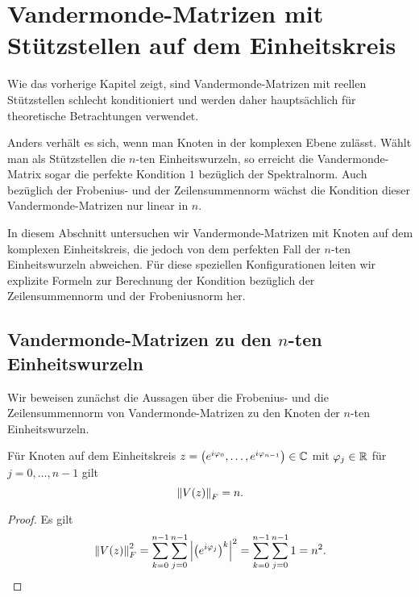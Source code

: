 \chapter{Vandermonde-Matrizen mit Stützstellen auf dem Einheitskreis}

Wie das vorherige Kapitel zeigt, sind Vandermonde-Matrizen mit reellen
Stützstellen schlecht konditioniert und werden daher hauptsächlich für
theoretische Betrachtungen verwendet.

Anders verhält es sich, wenn man Knoten in der komplexen Ebene zulässt.
Wählt man als Stützstellen die $n$-ten Einheitswurzeln, so erreicht die
Vandermonde-Matrix sogar die perfekte Kondition $1$ bezüglich der Spektralnorm.
Auch bezüglich der Frobenius- und der Zeilensummennorm wächst die Kondition
dieser Vandermonde-Matrizen nur linear in $n$.

In diesem Abschnitt untersuchen wir Vandermonde-Matrizen mit Knoten auf dem
komplexen Einheitskreis, die jedoch von dem perfekten Fall der $n$-ten
Einheitswurzeln abweichen.
Für diese speziellen Konfigurationen leiten wir explizite Formeln zur
Berechnung der Kondition bezüglich der Zeilensummennorm und der Frobeniusnorm
her.

\section[Vandermonde-Matrizen zu den $n$-ten Einheitswurzeln]{Vandermonde-Matrizen zu den \boldmath $n$-ten Einheitswurzeln}


Wir beweisen zunächst die Aussagen über die Frobenius- und die Zeilensummennorm
von Vandermonde-Matrizen zu den Knoten der $n$-ten Einheitswurzeln.
\begin{lemma}
    \label{lemma:frobenius_norm_vandermonde_unit_circle}
    Für Knoten auf dem Einheitskreis
    $z = \left(e^{i \varphi_0}, \dots, e^{i \varphi_{n-1}} \right) \in \mathbb{C}$
    mit $\varphi_j \in \mathbb{R}$ für $j = 0, \dots, n-1$ gilt
    \begin{equation}
        \left\lVert V \! \left( z \right) \right\rVert_F = n.
    \end{equation}
\end{lemma}
\begin{proof}
    Es gilt
    \[
        \left\lVert V \! \left( z \right) \right\rVert_F^2
        = \sum_{k=0}^{n-1} \sum_{j=0}^{n-1} \left\lvert  \left(e^{i \varphi_j}\right)^k  \right\rvert^2
        = \sum_{k=0}^{n-1} \sum_{j=0}^{n-1} 1
        = n^2.
    \]
\end{proof}

